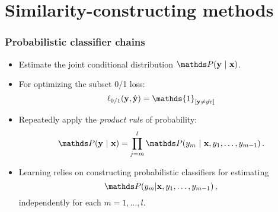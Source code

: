 \documentclass[11pt,compress,t,notes=noshow, xcolor=table]{beamer}
\begin{document}
\section{Similarity-constructing methods}




\begin{frame}
	\frametitle{Probabilistic classifier chains}
	
	\begin{itemize}
		\item Estimate the \alert{joint} conditional distribution $\P(\yv ~|~  \xv)$. 
		\item For optimizing the \alert{subset 0/1} loss:  $$ \ell_{0/1}(\yv, \hat{\yv}) = \mathds{1}_{[\yv \ne \hat{yv}]}$$
		\item Repeatedly apply the \emph{product rule} of probability:
		$$
		\P(\yv ~|~ \xv) = \prod_{j=m}^{l} \P(y_m ~|~ \xv, y_1, \ldots,y_{m-1}) \, .
		$$
		\item  Learning relies on constructing \alert{probabilistic classifiers} for estimating 
		$$
		\P( y_m|\xv, y_1, \ldots,y_{m-1}) \,,
		$$
		{independently} for each $m = 1, \ldots, l$. 
	\end{itemize}
\end{frame}
\end{document}
